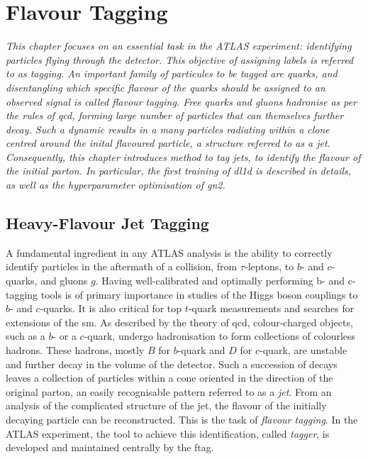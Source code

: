 \chapter{\color{oxfordblue} Flavour Tagging}
\ChapFrame

\textit{
This chapter focuses on an essential task in the ATLAS experiment: identifying particles flying through the detector. This objective of assigning labels is referred to as tagging. An important family of particules to be tagged are quarks, and disentangling which specific flavour of the quarks should be assigned to an observed signal is called flavour tagging. Free quarks and gluons hadronise as per the rules of \gls{qcd}, forming large number of particles that can themselves further decay. Such a dynamic results in a many particles radiating within a clone centred around the inital flavoured particle, a structure referred to as a jet. Consequently, this chapter introduces method to tag jets, to identify the flavour of the initial parton. In particular, the first training of \gls{dl1d} is described in details, as well as the hyperparameter optimisation of \gls{gn2}.
}

\section{Heavy-Flavour Jet Tagging}
A fundamental ingredient in any ATLAS analysis is the ability to correctly identify particles in the aftermath of a collision, from $\tau$-leptons, to $b$- and $c$-quarks, and gluons $g$. Having well-calibrated and optimally performing b- and c-tagging tools is of primary importance in studies of the Higgs boson couplings to $b$- and $c$-quarks. It is also critical for top $t$-quark measurements and searches for extensions of the \gls{sm}. As described by the theory of \gls{qcd}, colour-charged objects, such as a $b$- or a $c$-quark, undergo hadronisation to form collections of colourless hadrons. These hadrons, mostly $B$ for $b$-quark and $D$ for $c$-quark, are unstable and further decay in the volume of the detector. Such a succession of decays leaves a collection of particles within a cone oriented in the direction of the original parton, an easily recognisable pattern referred to as a \textit{jet}. From an analysis of the complicated structure of the jet, the flavour of the initially decaying particle can be reconstructed. This is the task of \textit{flavour tagging}. In the ATLAS experiment, the tool to achieve this identification, called \textit{tagger}, is developed and maintained centrally by the \gls{ftag}. \\

